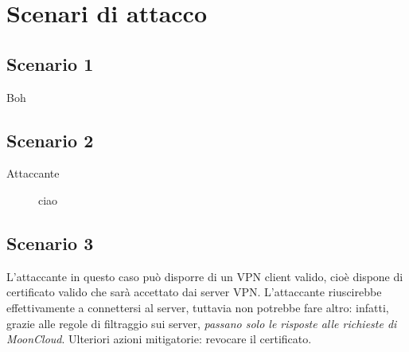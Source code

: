 \section{Scenari di attacco}\label{sec:attacks}

\subsection{Scenario 1}
Boh

\subsection{Scenario 2}
\begin{description}
    \item[Attaccante]ciao
\end{description}

\subsection{Scenario 3}
L'attaccante in questo caso può disporre di un VPN client valido,
cioè dispone di certificato valido che sarà accettato dai server
VPN.
L'attaccante riuscirebbe effettivamente a connettersi al server,
tuttavia non potrebbe fare altro: infatti, grazie alle regole
di filtraggio sui server, \textit{passano solo le risposte
alle richieste di MoonCloud}.
Ulteriori azioni mitigatorie: revocare il certificato.

